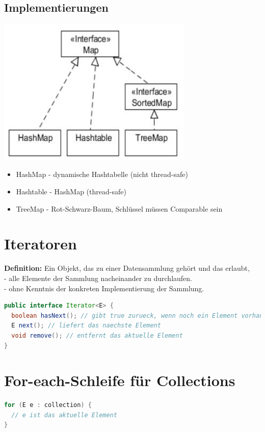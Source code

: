 \documentclass{scrreprt}
\begin{document}
\subsection{Implementierungen}
\includegraphics[width=0.7\textwidth]{graphics/Maps}
\begin{itemize}
  \item HashMap - dynamische Hashtabelle (nicht thread-safe)
  \item Hashtable - HashMap (thread-safe)
  \item TreeMap - Rot-Schwarz-Baum, Schlüssel müssen Comparable sein
\end{itemize}
\section{Iteratoren}
\textbf{Definition:} Ein Objekt, das zu einer Datensammlung gehört und das erlaubt, 
\\- alle Elemente der Sammlung nacheinander zu durchlaufen.
\\- ohne Kenntnis der konkreten Implementierung der Sammlung.
\begin{lstlisting}[language=Java]
public interface Iterator<E> {
  boolean hasNext(); // gibt true zurueck, wenn noch ein Element vorhanden ist
  E next(); // liefert das naechste Element
  void remove(); // entfernt das aktuelle Element
}
\end{lstlisting}
\section{For-each-Schleife für Collections}
\begin{lstlisting}[language=Java]
for (E e : collection) {
  // e ist das aktuelle Element
}
\end{lstlisting}
\end{document}
